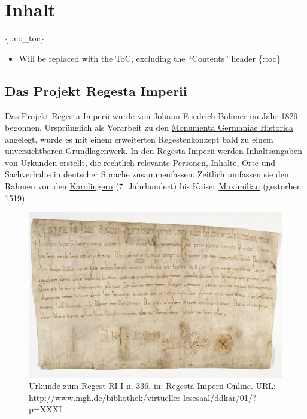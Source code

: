 \documentclass[ngerman,]{scrreprt}
\providecommand{\tightlist}{%
  \setlength{\itemsep}{0pt}\setlength{\parskip}{0pt}}
\begin{document}
\hypertarget{inhalt-2}{%
\chapter{Inhalt}\label{inhalt-2}}

\{:.no\_toc\}

\begin{itemize}
\tightlist
\item
  Will be replaced with the ToC, excluding the ``Contents'' header \{:toc\}
\end{itemize}

\hypertarget{das-projekt-regesta-imperii}{%
\section{Das Projekt Regesta Imperii}\label{das-projekt-regesta-imperii}}

Das Projekt Regesta Imperii wurde von Johann-Friedrich Böhmer im Jahr 1829 begonnen. Ursprünglich als Vorarbeit zu den \href{https://www.mgh.de}{Monumenta Germaniae Historica} angelegt, wurde es mit einem erweiterten Regestenkonzept bald zu einem unverzichtbaren Grundlagenwerk. In den Regesta Imperii werden Inhaltsangaben von Urkunden erstellt, die rechtlich relevante Personen, Inhalte, Orte und Sachverhalte in deutscher Sprache zusammenfassen. Zeitlich umfassen sie den Rahmen von den \href{https://de.wikipedia.org/wiki/Karolinger}{Karolingern} (7. Jahrhundert) bis Kaiser \href{https://de.wikipedia.org/wiki/Maximilian_I._(HRR)}{Maximilian} (gestorben 1519).

\begin{figure}
\centering
\includegraphics{Bilder/Beispielurkunde.jpg}
\caption{Urkunde zum Regest RI I n. 336, in: Regesta Imperii Online. URL: http://www.mgh.de/bibliothek/virtueller-lesesaal/ddkar/01/?p=XXXI}
\end{figure}
\end{document}

